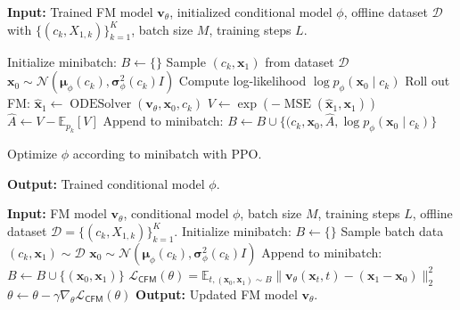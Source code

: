 \begin{algorithm}[t]
\caption{Training conditional model for non-fixed condition in robot policy}
\label{algo:non-fixed-init-sources}
\begin{algorithmic}[1]
\STATE \textbf{Input:} Trained FM model $\bm{v}_\theta$, initialized conditional model $\phi$, offline dataset $\mathcal{D}$ with $\{(c_k, X_{1,k})\}_{k=1}^K$, batch size $M$, training steps $L$.

    \STATE Initialize minibatch: $B \leftarrow \{\}$
        \STATE Sample $(c_k, \bm{x}_1)$ from dataset $\mathcal{D}$
        \STATE $\bm{x}_0 \sim \mathcal{N}(\bm{\mu}_\phi(c_k), \bm{\sigma}^2_\phi(c_k)I)$
        \STATE Compute log-likelihood $\log p_\phi(\bm{x}_0 \mid c_k)$
        \STATE Roll out FM: $\hat{\bm{x}}_1 \leftarrow \operatorname{ODESolver}(\bm{v}_\theta, \bm{x}_0, c_k)$
        \STATE $V \leftarrow \exp(-\operatorname{MSE}(\hat{\bm{x}}_1, \bm{x}_1))$
        \STATE $\hat{A} \leftarrow V - \mathbb{E}_{p_k}[V]$
        \STATE Append to minibatch: $B \leftarrow B \cup \{(c_k, \bm{x}_0, \hat{A}, \log p_\phi(\bm{x}_0 \mid c_k)\}$
        
    \ENDFOR
    \STATE Optimize $\phi$ according to minibatch with PPO. 
    
\ENDFOR
\STATE \textbf{Output:} Trained conditional model $\phi$.
\end{algorithmic}
\end{algorithm}


\begin{algorithm}[t]
\caption{Fine-tuning FM model for non-fixed condition in robot policy}
\label{algo:non-fixed-train-fm}
\begin{algorithmic}[1]
\STATE \textbf{Input:} FM model $\bm{v}_\theta$, conditional model $\phi$, batch size $M$, training steps $L$, offline dataset $\mathcal{D} = \{(c_k, X_{1,k})\}_{k=1}^K$.
    \STATE Initialize minibatch: $B \leftarrow \{\}$
        \STATE Sample batch data  $(c_k, \bm{x}_1) \sim \mathcal{D}$
        \STATE $\bm{x}_0 \sim \mathcal{N}(\bm{\mu}_\phi(c_k), \bm{\sigma}^2_\phi(c_k)I)$
        \STATE Append to minibatch: $B \leftarrow B \cup \{(\bm{x}_0, \bm{x}_1)\}$
    \ENDFOR
    \STATE $\mathcal{L}_{\textsf{CFM}}(\theta) = \mathbb{E}_{t, (\bm{x}_0, \bm{x}_1) \sim B} \| \bm{v}_\theta(\bm{x}_t, t) - (\bm{x}_{1} - \bm{x}_{0}) \|_2^2$
    \STATE $\theta \leftarrow \theta - \gamma \nabla_\theta \mathcal{L}_{\textsf{CFM}}(\theta)$
\ENDFOR
\STATE \textbf{Output:} Updated FM model $\bm{v}_\theta$.
\end{algorithmic}
\end{algorithm}

